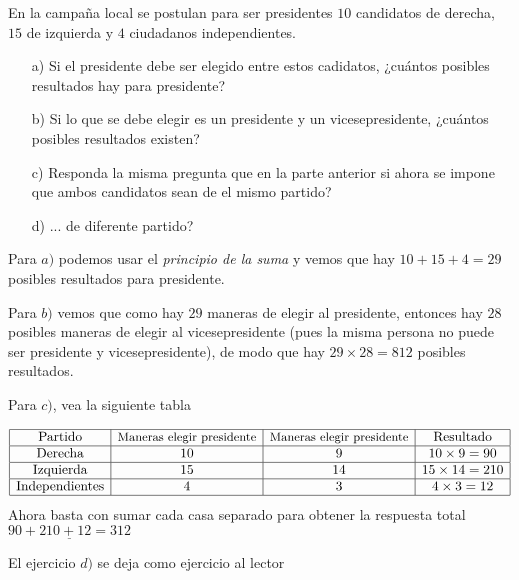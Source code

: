 \documentclass[11pt]{scrartcl}
\begin{document}
\begin{example}

    En la campaña local se postulan para ser presidentes $10$
candidatos de derecha, $15$ de izquierda y $4$ ciudadanos independientes.

\begin{enumerate}
    \item[a)] Si el presidente debe ser elegido entre estos cadidatos, ¿cuántos posibles resultados hay para presidente?
    \item[b)] Si lo que se debe elegir es un presidente y un vicesepresidente, ¿cuántos posibles resultados existen?
    \item[c)] Responda la misma pregunta que en la parte anterior si ahora se
    impone que ambos candidatos sean de el mismo partido?
    \item [d)]... de diferente partido?
    
\end{enumerate}


\end{example}
\begin{flushleft}
Para $a)$ podemos usar el \textit{principio de la suma} y vemos que hay $10+15+4=29$ posibles resultados para presidente.
\vspace*{0.5cm}

Para $b)$ vemos que como hay $29$ maneras de elegir al presidente, entonces  hay $28$ posibles maneras de elegir al vicesepresidente (pues la misma persona no puede ser presidente y vicesepresidente), de modo que hay $29\times 28=812$ posibles resultados. 
\vspace*{0.5cm}

Para $c)$, vea la siguiente tabla

\[ \begin{array}{|c|c|c|c|}\hline
\text{Partido}&\text{\small{Maneras elegir presidente}} & \text{\small{Maneras elegir presidente}} &\text{Resultado}\\ \hline

\text{Derecha} & 10 & 9& 10\times 9=90 \\ \hline
\text{Izquierda} & 15 & 14 & 15\times 14=210 \\ \hline
\text{Independientes} & 4 & 3 & 4\times 3=12 \\ \hline
    
\end{array}\]
Ahora basta con sumar cada casa separado para obtener la respuesta total $\underline{90+210+12=312}$

\vspace*{0.3cm}
El ejercicio $d)$ se deja como ejercicio al lector
\vspace*{0.5cm}
\end{flushleft}
\end{document}
